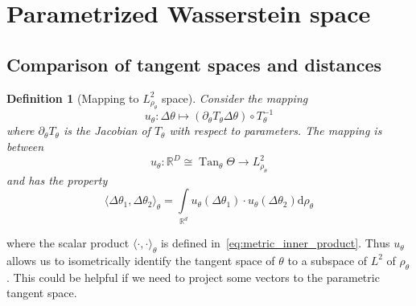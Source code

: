 \documentclass{article} %
\newtheorem{definition}{Definition}[section]
\numberwithin{equation}{subsection}
\numberwithin{theorem}{section}
\newcommand{\dd}{\mathrm{d}}
\begin{document}
% 

\section{Parametrized Wasserstein space}\label{ss:app_param_wasserstein}
    \subsection{Comparison of tangent spaces and distances}
    \begin{definition}[Mapping to $L^2_{\rho_{\theta}}$ space]
        Consider the mapping
        \begin{equation}
            {u_\theta} : \Delta\theta \mapsto \left(\partial_{\theta} T_{\theta} \Delta{\theta}  \right)\circ T^{-1}_{\theta} 
        \end{equation}
        where $\partial_{\theta}T_{\theta}$ is the Jacobian of $T_\theta$ with respect to parameters.
        The mapping is between
        \begin{equation}
            u_\theta : \mathbb{R}^D \cong \operatorname{Tan}_{\theta}\Theta \to L^2_{\rho_\theta}
        \end{equation}
        and has the property
        \[
            \langle \Delta\theta_1, \Delta\theta_2 \rangle_{\theta} 
            = \int\limits_{\mathbb{R}^d} {u}_\theta(\Delta\theta_1)\cdot{u}_\theta(\Delta\theta_2) \dd \rho_{\theta}
        \]
    \end{definition}
    where the scalar product $\langle \cdot, \cdot \rangle_\theta$ is defined in~\eqref{eq:metric_inner_product}.
    Thus $u_\theta$ allows us to isometrically identify the tangent space of $\theta$ to a subspace of $L^2$ of $\rho_{\theta}$.
    This could be helpful if we need to project some vectors to the parametric tangent space.
\end{document}

